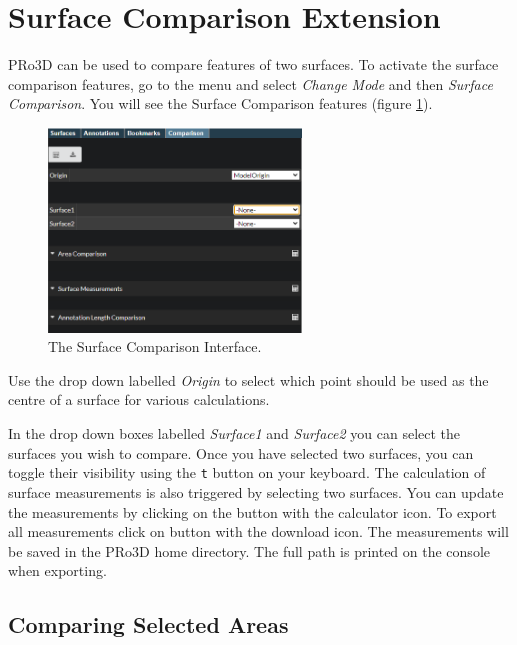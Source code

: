 \section{Surface Comparison Extension}

PRo3D can be used to compare features of two surfaces. To activate the surface comparison features, go to the menu and select \emph{Change Mode} and then \emph{Surface Comparison}. You will see the Surface Comparison features (figure  \ref{fig:surfaceComparison}).


\begin{figure}[h]
	\centering
	\includegraphics[width=0.6\textwidth]{pics/surfaceComparison.PNG}
	\caption[The surface comparison interface.]{The Surface Comparison Interface.}
	\label{fig:surfaceComparison}
\end{figure}

Use the drop down labelled \emph{Origin} to select which point should be used as the centre of a surface for various calculations.

In the drop down boxes labelled \emph{Surface1} and \emph{Surface2} you can select the surfaces you wish to compare. Once you have selected two surfaces, you can toggle their visibility using the \texttt{t} button on your keyboard. The calculation of surface measurements is also triggered by selecting two surfaces. You can update the measurements by clicking on the button with the calculator icon. To export all measurements click on button with the download icon. The measurements will be saved in the PRo3D home directory. The full path is printed on the console when exporting.

\subsection{Comparing Selected Areas}

